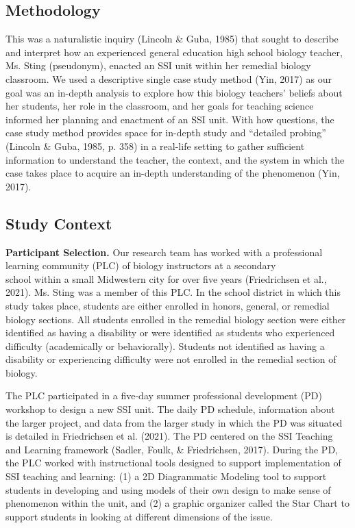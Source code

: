 \documentclass[11.5pt]{sig-alternate}
\begin{document}
\begin{large}
\section*{Methodology}

This was a naturalistic inquiry (Lincoln \& Guba, 1985) that sought to describe and interpret how an experienced general education high school biology teacher, Ms. Sting (pseudonym), enacted an SSI unit within her remedial biology classroom. We used a descriptive single case study method (Yin, 2017) as our goal was an in-depth analysis to explore how this biology teachers’ beliefs about her students, her role in the classroom, and her goals for teaching science informed her planning and enactment of an SSI unit. With how questions, the case study method provides space for in-depth study and “detailed probing” (Lincoln \& Guba, 1985, p. 358) in a real-life setting to gather sufficient information to understand the teacher, the context, and the system in which the case takes place to acquire an in-depth understanding of the phenomenon
(Yin, 2017).

\subsection*{Study Context}

\textbf{Participant Selection.} Our research team has worked with a professional learning community (PLC) of biology instructors at a secondary \\school within a small Midwestern city for over five years (Friedrichsen et al., 2021). Ms. Sting was a member of this PLC. In the school district in which this study takes place, students are either enrolled in honors, general, or remedial biology sections. All students enrolled in the remedial biology section were either identified as having a disability or were identified as students who experienced difficulty (academically or behaviorally). Students not identified as having a disability or experiencing difficulty were not enrolled in the remedial section of biology.

The PLC participated in a five-day summer professional development (PD) workshop to design a new SSI unit. The daily PD schedule, information about the larger project, and data from the larger study in which the PD was situated is detailed in Friedrichsen et al. (2021). The PD centered on the SSI Teaching and Learning framework (Sadler, Foulk, \& Friedrichsen, 2017). During the PD, the PLC worked with instructional tools designed to support implementation of SSI teaching and learning: (1) a 2D Diagrammatic Modeling tool to support students in developing and using models of their own design to make sense of phenomenon within the unit, and (2) a graphic organizer called the Star Chart to support students in looking at different dimensions of the issue.


\end{large}
\end{document}
